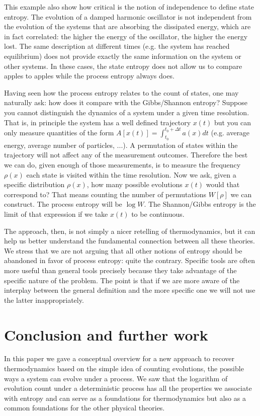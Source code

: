 \documentclass[letterpaper,twocolumn]{article}
\begin{document}
This example also show how critical is the notion of independence to define state entropy. The evolution of a damped harmonic oscillator is not independent from the evolution of the systems that are absorbing the dissipated energy, which are in fact correlated: the higher the energy of the oscillator, the higher the energy lost. The same description at different times (e.g. the system has reached equilibrium) does not provide exactly the same information on the system or other systems. In these cases, the state entropy does not allow us to compare apples to apples while the process entropy always does.

Having seen how the process entropy relates to the count of states, one may naturally ask: how does it compare with the Gibbs/Shannon entropy? Suppose you cannot distinguish the dynamics of a system under a given time resolution. That is, in principle the system has a well defined trajectory $x(t)$ but you can only measure quantities of the form $A[x(t)] = \int_{t_0}^{t_0 + \Delta t} a(x) dt$ (e.g. average energy, average number of particles, ...). A permutation of states within the trajectory will not affect any of the measurement outcomes. Therefore the best we can do, given enough of those measurements, is to measure the frequency $\rho(x)$ each state is visited within the time resolution. Now we ask, given a specific distribution $\rho(x)$, how many possible evolutions $x(t)$ would that correspond to? That means counting the number of permutations $W[\rho]$ we can construct. The process entropy will be $\log W$. The Shannon/Gibbs entropy is the limit of that expression if we take $x(t)$ to be continuous.

The approach, then, is not simply a nicer retelling of thermodynamics, but it can help us better understand the fundamental connection between all these theories. We stress that we are not arguing that all other notions of entropy should be abandoned in favor of process entropy: quite the contrary. Specific tools are often more useful than general tools precisely because they take advantage of the specific nature of the problem. The point is that if we are more aware of the interplay between the general definition and the more specific one we will not use the latter inappropriately.

\section{Conclusion and further work}

In this paper we gave a conceptual overview for a new approach to recover thermodynamics based on the simple idea of counting evolutions, the possible ways a system can evolve under a process. We saw that the logarithm of evolution count under a deterministic process has all the properties we associate with entropy and can serve as a foundations for thermodynamics but also as a common foundations for the other physical theories.
\end{document}
